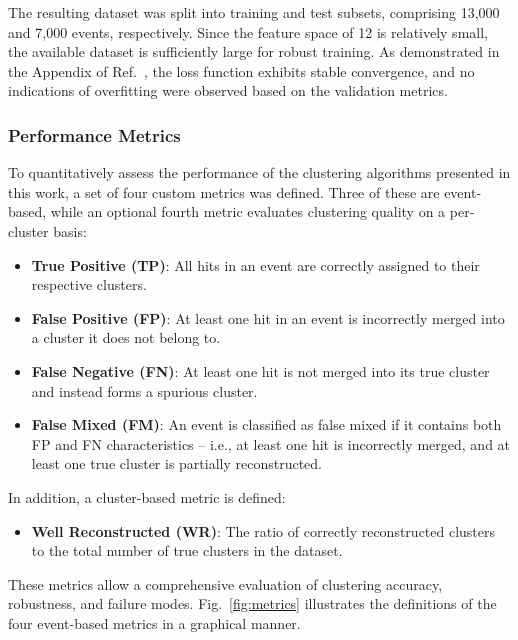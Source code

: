 The resulting dataset was split into training and test subsets, comprising 13{,}000 and 7{,}000 events, respectively. Since the feature space of  12 is relatively small, the available dataset is sufficiently large for robust training. As demonstrated in the Appendix of Ref.~\cite{JENEGGER2026171048}, the loss function exhibits stable convergence, and no indications of overfitting were observed based on the validation metrics.

\subsubsection{Performance Metrics}\label{s_sec:metrics}
To quantitatively assess the performance of the clustering algorithms presented in this work, a set of four custom metrics was defined. Three of these are event-based, while an optional fourth metric evaluates clustering quality on a per-cluster basis:
\begin{itemize}
    \item \textbf{True Positive (TP)}: All hits in an event are correctly assigned to their respective clusters.
    \item \textbf{False Positive (FP)}: At least one hit in an event is incorrectly merged into a cluster it does not belong to.
    \item \textbf{False Negative (FN)}: At least one hit is not merged into its true cluster and instead forms a spurious cluster.
    \item \textbf{False Mixed (FM)}: An event is classified as false mixed if it contains both FP and FN characteristics -- i.e., at least one hit is incorrectly merged, and at least one true cluster is partially reconstructed.
\end{itemize}
In addition, a cluster-based metric is defined:
\begin{itemize}
    \item \textbf{Well Reconstructed (WR)}: The ratio of correctly reconstructed clusters to the total number of true clusters in the dataset.
\end{itemize}
These metrics allow a comprehensive evaluation of clustering accuracy, robustness, and failure modes. Fig.~\ref{fig:metrics} illustrates the definitions of the four event-based metrics in a graphical manner.\newline

